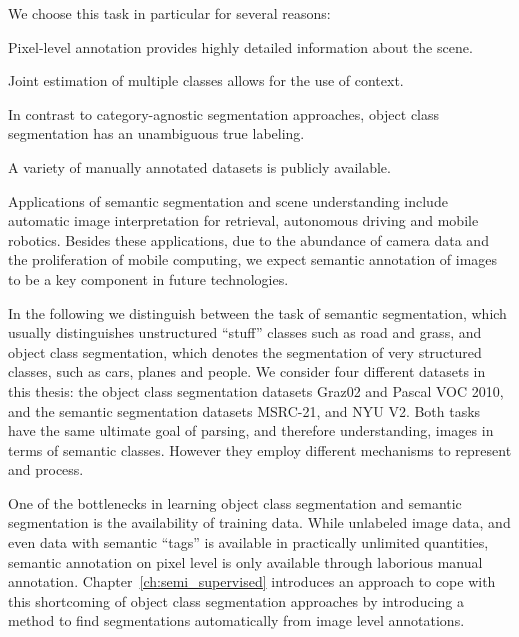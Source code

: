 We choose this task in particular for several reasons:
\begin{itemize*}
    \item Pixel-level annotation provides highly detailed information about the scene.
    \item Joint estimation of multiple classes allows for the use of context.
    \item In contrast to category-agnostic segmentation approaches, object class segmentation
        has an unambiguous true labeling.
    \item A variety of manually annotated datasets is publicly available.
\end{itemize*}
%
Applications of semantic segmentation and scene understanding include automatic
image interpretation for retrieval, autonomous driving and mobile robotics.
Besides these applications, due to the abundance of camera data and the
proliferation of mobile computing, we expect semantic annotation of images to
be a key component in future technologies.

In the following we distinguish between the task of semantic segmentation,
which usually distinguishes unstructured ``stuff'' classes such as road and
grass, and object class segmentation, which denotes the segmentation of very
structured classes, such as cars, planes and people. We consider four
different datasets in this thesis: the object class segmentation datasets
Graz02 and Pascal VOC 2010, and the semantic segmentation datasets MSRC-21, and
NYU V2.
%
Both tasks have the same ultimate goal of parsing, and therefore understanding,
images in terms of semantic classes. However they employ different mechanisms
to represent and process.

One of the bottlenecks in learning object class segmentation and semantic
segmentation is the availability of training data.  While unlabeled image data,
and even data with semantic
``tags'' is available in practically unlimited quantities, semantic annotation
on pixel level is only available through laborious manual annotation. 
Chapter~\ref{ch:semi_supervised} introduces an approach to cope with this
shortcoming of object class segmentation approaches by introducing a method to
find segmentations automatically from image level annotations.

